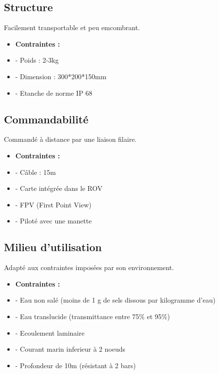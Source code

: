 \documentclass[a4paper,11pt]{report}
\begin{document}
						\subsection{Structure}
								Facilement transportable et peu emcombrant.\newline
								\begin{itemize}
										\item \textbf{Contraintes :}
										\item - Poids : 2-3kg
										\item - Dimension : 300*200*150mm
										\item - Etanche de norme IP 68 \newline \newline
									\end{itemize}

						\subsection{Commandabilité}
								Commandé à distance par une liaison filaire.\newline
								\begin{itemize}
										\item \textbf{Contraintes :}
										\item - Câble : 15m
										\item - Carte intégrée dans le ROV
										\item - FPV (First Point View)
										\item - Piloté avec une manette \newline \newline
								\end{itemize}

						\subsection{Milieu d'utilisation}
								Adapté aux contraintes imposées par son environnement. \newline
								\begin{itemize}
										\item \textbf{Contraintes :}
										\item - Eau non salé (moins de 1 g de sels dissous par kilogramme d'eau)
										\item - Eau translucide (transmittance entre 75\% et 95\%)
										\item - Ecoulement laminaire
										\item - Courant marin inferieur à 2 noeuds
										\item - Profondeur de 10m (résistant à 2 bars) \newline \newline
								\end{itemize}
\end{document}
